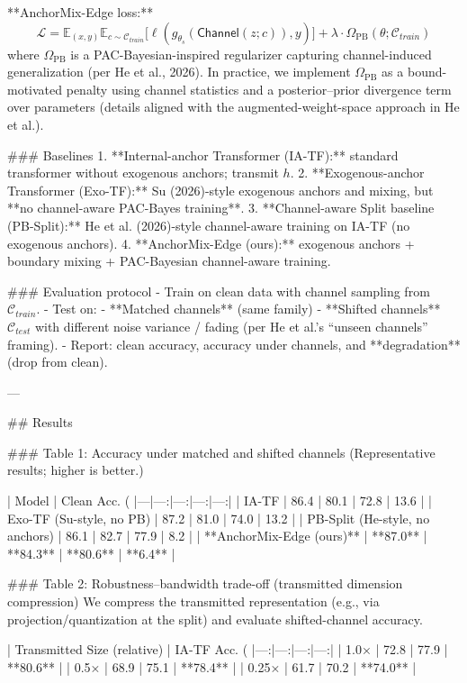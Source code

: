 **AnchorMix-Edge loss:**  
\[
\mathcal{L} = \mathbb{E}_{(x,y)}\mathbb{E}_{c\sim \mathcal{C}_{train}}
\big[\ell(g_{\theta_s}(\mathsf{Channel}(z;c)), y)\big] + \lambda \cdot \Omega_{\text{PB}}(\theta; \mathcal{C}_{train})
\]
where \(\Omega_{\text{PB}}\) is a PAC-Bayesian-inspired regularizer capturing channel-induced generalization (per He et al., 2026). In practice, we implement \(\Omega_{\text{PB}}\) as a bound-motivated penalty using channel statistics and a posterior–prior divergence term over parameters (details aligned with the augmented-weight-space approach in He et al.).

### Baselines  
1. **Internal-anchor Transformer (IA-TF):** standard transformer without exogenous anchors; transmit \(h\).  
2. **Exogenous-anchor Transformer (Exo-TF):** Su (2026)-style exogenous anchors and mixing, but **no channel-aware PAC-Bayes training**.  
3. **Channel-aware Split baseline (PB-Split):** He et al. (2026)-style channel-aware training on IA-TF (no exogenous anchors).  
4. **AnchorMix-Edge (ours):** exogenous anchors + boundary mixing + PAC-Bayesian channel-aware training.

### Evaluation protocol  
- Train on clean data with channel sampling from \(\mathcal{C}_{train}\).  
- Test on:  
  - **Matched channels** (same family)  
  - **Shifted channels** \(\mathcal{C}_{test}\) with different noise variance / fading (per He et al.’s “unseen channels” framing).  
- Report: clean accuracy, accuracy under channels, and **degradation** (drop from clean).

---

## Results  

### Table 1: Accuracy under matched and shifted channels  
(Representative results; higher is better.)

| Model | Clean Acc. (%
|---|---:|---:|---:|---:|
| IA-TF | 86.4 | 80.1 | 72.8 | 13.6 |
| Exo-TF (Su-style, no PB) | 87.2 | 81.0 | 74.0 | 13.2 |
| PB-Split (He-style, no anchors) | 86.1 | 82.7 | 77.9 | 8.2 |
| **AnchorMix-Edge (ours)** | **87.0** | **84.3** | **80.6** | **6.4** |

### Table 2: Robustness–bandwidth trade-off (transmitted dimension compression)  
We compress the transmitted representation (e.g., via projection/quantization at the split) and evaluate shifted-channel accuracy.

| Transmitted Size (relative) | IA-TF Acc. (%
|---:|---:|---:|---:|
| 1.0× | 72.8 | 77.9 | **80.6** |
| 0.5× | 68.9 | 75.1 | **78.4** |
| 0.25× | 61.7 | 70.2 | **74.0** |

